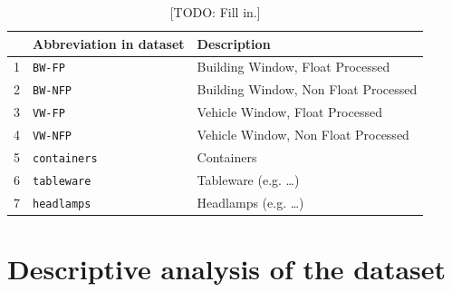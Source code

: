 \documentclass[dtu]{dtuarticle}
\newcommand{\todo}[1]{\color{red}[TODO: #1]\color{black}}
\begin{document}
	\begin{table}
		\centering
		\begin{tabular}{r|l|l}
			\textbf{} & \textbf{Abbreviation in dataset} & \textbf{Description}                 \\ \hline\hline
			1 & \texttt{BW-FP}                   & Building Window, Float Processed     \\ \hline
			2 & \texttt{BW-NFP}                  & Building Window, Non Float Processed \\ \hline
			3 & \texttt{VW-FP}                   & Vehicle Window, Float Processed      \\ \hline
			4 & \texttt{VW-NFP}                  & Vehicle Window, Non Float Processed  \\ \hline
			5 & \texttt{containers}              & Containers                           \\ \hline
			6 & \texttt{tableware}               & Tableware (e.g. \dots)               \\ \hline
			7 & \texttt{headlamps}               & Headlamps (e.g. \dots)
		\end{tabular}
		\caption{\todo{Fill in.}}
		\label{table:types}
	\end{table}

	\section{Descriptive analysis of the dataset}

%
\end{document}
